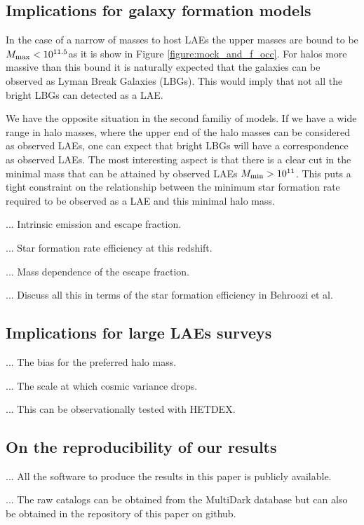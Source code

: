\documentclass[usenatbib]{mn2e}
\newcommand{\hMsun}{{\ifmmode{h^{-1}{\rm {M_{\odot}}}}\else{$h^{-1}{\rm{M_{\odot}}}$}\fi}}
\begin{document}
\subsection{Implications for galaxy formation models}

In the case of a narrow of masses to host LAEs the upper masses are
bound to be $M_{\rm max}< 10^{11.5}$\hMsun as it is show in Figure
\ref{figure:mock_and_f_occ}. For halos more massive than this bound it
is naturally expected that the galaxies can be observed as Lyman Break
Galaxies (LBGs). This would imply that not all the bright LBGs can
detected as a LAE.

We have the opposite situation in the second familiy of models. If
we have a wide range in halo masses, where the upper end of the halo
masses can be considered as observed LAEs, one can expect that bright
LBGs will have a correspondence as observed LAEs. The most interesting
aspect is that there is a clear cut in the minimal mass that can be
attained by observed LAEs $M_{\rm min}> 10^{11}$\hMsun. This puts a tight
constraint on the relationship between the minimum star formation rate
required to be observed as a LAE and this minimal halo mass.


... Intrinsic emission and escape fraction.

... Star formation rate efficiency at this redshift.

... Mass dependence of the escape fraction.

... Discuss all this in terms of the star formation efficiency in
Behroozi et al.

\subsection{Implications for large LAEs surveys}

... The bias for the preferred halo mass.

... The scale at which cosmic variance drops.

... This can be observationally tested with HETDEX.

\subsection{On the reproducibility of our results}

... All the software to produce the results in this paper is publicly
available. 

... The raw catalogs can be obtained from the MultiDark database but
can also be obtained in the repository of this paper on github.
\end{document}
